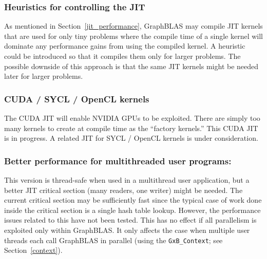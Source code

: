 \subsubsection{Heuristics for controlling the JIT}
As mentioned in Section~\ref{jit_performance}, GraphBLAS may compile JIT
kernels that are used for only tiny problems where the compile time of a single
kernel will dominate any performance gains from using the compiled kernel.  A
heuristic could be introduced so that it compiles them only for larger
problems.  The possible downside of this approach is that the same JIT kernels
might be needed later for larger problems.

\subsubsection{CUDA / SYCL / OpenCL kernels}
The CUDA JIT will enable NVIDIA GPUs to be exploited.  There are simply too
many kernels to create at compile time as the ``factory kernels.''  This CUDA
JIT is in progress. %
A related JIT for SYCL / OpenCL kernels is under consideration.

\subsubsection{Better performance for multithreaded user programs:}
This version is thread-safe when used in a multithread user application, but a
better JIT critical section (many readers, one writer) might be needed.  The
current critical section may be sufficiently fast since the typical case of
work done inside the critical section is a single hash table lookup.  However,
the performance issues related to this have not been tested.  This has no
effect if all parallelism is exploited only within GraphBLAS.  It only
affects the case when multiple user threads each call GraphBLAS in parallel
(using the \verb'GxB_Context'; see Section~\ref{context}).

